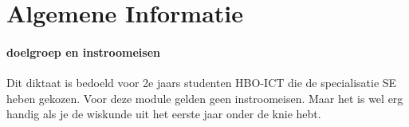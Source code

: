 \documentclass[hidelinks, a4wide, 12pt,  twoside]{book}
\begin{document}
\newcommand{\vecdrie}[4][black] {
$$
\color{#1}
\begin{pmatrix} 
#2  \\ 
#3  \\ 
#4
\end{pmatrix}       $$}
\newcommand{\vecdriesnel}[1] {
$$
\begin{pmatrix} 
#1_1  \\ 
#1_2  \\ 
#1_3
\end{pmatrix}       $$}
\newcommand{\vectwee}[3][black] {
$$
\color{#1}
\begin{pmatrix} 
#2  \\ 
#3 
\end{pmatrix}       $$}
\newcommand{\vectweesnel}[1] {
$$
\begin{pmatrix} 
#1_1  \\ 
#1_2  
\end{pmatrix}       $$}
\newcommand{\vecvier}[4] {
$$
\begin{pmatrix} 
#1  \\ 
#2  \\ 
#3  \\
#4
\end{pmatrix}       $$}
\newcommand{\V}[1]{
$ \vec{#1} $}
\newcommand{\mattwee}[2]{
\begin{pmatrix}
#1 \\
#2
\end{pmatrix}}
\newcommand{\matdrie}[3]{
\begin{pmatrix}
#1 \\
#2 \\
#3
\end{pmatrix}}
\newcommand{\matvier}[4]{
\begin{pmatrix}
#1 \\
#2 \\
#3 \\
#4
\end{pmatrix}}


\tableofcontents

\chapter{Algemene Informatie}

\label{chap:algemeneinformatie}


\subsubsection{doelgroep en instroomeisen}
Dit diktaat is bedoeld voor 2e jaars studenten HBO-ICT die de specialisatie SE heben gekozen. Voor deze module gelden geen instroomeisen. Maar het is wel erg handig als je de wiskunde uit het eerste jaar onder de knie hebt.
\end{document}
